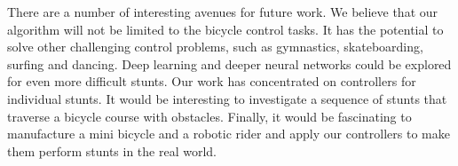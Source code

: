 There are a number of interesting avenues for future work.  We believe that our algorithm will not be limited to the bicycle control tasks. It has the potential to solve other challenging control problems, such as gymnastics, skateboarding, surfing and dancing. Deep learning \cite{Hinton:2007} and deeper neural networks could be explored for even more difficult stunts. Our work has concentrated on controllers for individual stunts. It would be interesting to investigate a sequence of stunts that traverse a bicycle course with obstacles. Finally, it would be fascinating to manufacture a mini bicycle and a robotic rider and apply our controllers to make them perform stunts in the real world.
